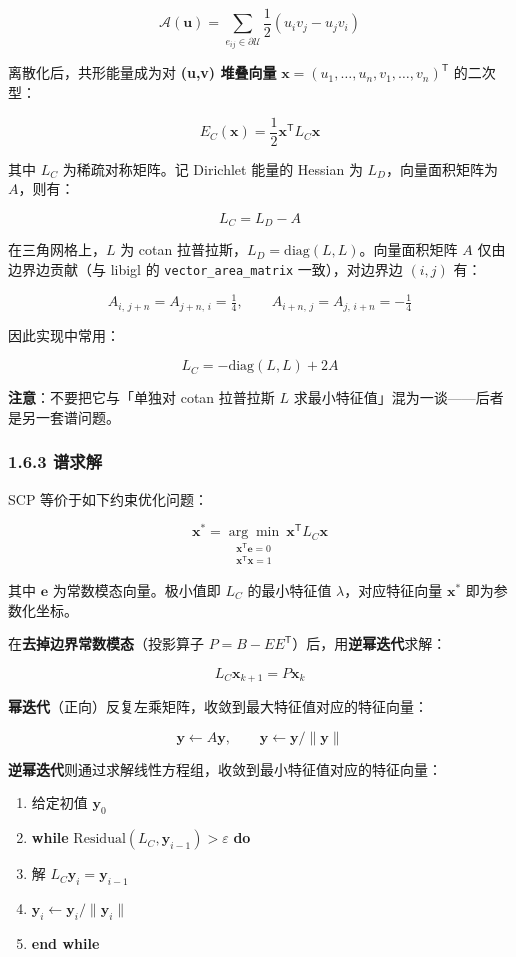 \documentclass[
]{article}
\providecommand{\tightlist}{%
  \setlength{\itemsep}{0pt}\setlength{\parskip}{0pt}}
\begin{document}
\[
\mathcal{A}(\mathbf{u}) = \sum_{e_{ij} \in \partial \mathcal{U}} \frac{1}{2}(u_i v_j - u_j v_i)
\]

离散化后，共形能量成为对 \textbf{(u,v) 堆叠向量}
\(\mathbf{x} = (u_1,\ldots,u_n,v_1,\ldots,v_n)^{\mathsf T}\) 的二次型：

\[
E_C(\mathbf{x}) = \frac{1}{2}\mathbf{x}^{\mathsf T} L_C \mathbf{x}
\]

其中 \(L_C\) 为稀疏对称矩阵。记 Dirichlet 能量的 Hessian 为
\(L_D\)，向量面积矩阵为 \(A\)，则有：

\[
L_C = L_D - A
\]

在三角网格上，\(L\) 为 cotan
拉普拉斯，\(L_D = \mathrm{diag}(L,L)\)。向量面积矩阵 \(A\)
仅由边界边贡献（与 libigl 的 \texttt{vector\_area\_matrix}
一致），对边界边 \((i,j)\) 有：

\[
A_{i,\,j+n} = A_{j+n,\,i} = \tfrac{1}{4}, \qquad
A_{i+n,\,j} = A_{j,\,i+n} = -\tfrac{1}{4}
\]

因此实现中常用：

\[
L_C = -\mathrm{diag}(L,L) + 2A
\]

\textbf{注意}：不要把它与「单独对 cotan 拉普拉斯 \(L\)
求最小特征值」混为一谈------后者是另一套谱问题。

\subsubsection{1.6.3 谱求解}\label{ux8c31ux6c42ux89e3}

SCP 等价于如下约束优化问题：

\[
\mathbf{x}^* = \underset{\substack{\mathbf{x}^{\mathsf T}\mathbf{e}=0 \\ \mathbf{x}^{\mathsf T}\mathbf{x}=1}}{\arg\min}\ \mathbf{x}^{\mathsf T} L_C \mathbf{x}
\]

其中 \(\mathbf{e}\) 为常数模态向量。极小值即 \(L_C\) 的最小特征值
\(\lambda\)，对应特征向量 \(\mathbf{x}^*\) 即为参数化坐标。

在\textbf{去掉边界常数模态}（投影算子
\(P = B - EE^{\mathsf T}\)）后，用\textbf{逆幂迭代}求解：

\[
L_C \mathbf{x}_{k+1} = P \mathbf{x}_k
\]

\textbf{幂迭代}（正向）反复左乘矩阵，收敛到最大特征值对应的特征向量：

\[
\mathbf{y} \leftarrow A\mathbf{y}, \qquad \mathbf{y} \leftarrow \mathbf{y}/\|\mathbf{y}\|
\]

\textbf{逆幂迭代}则通过求解线性方程组，收敛到最小特征值对应的特征向量：

\begin{enumerate}
\def\labelenumi{\arabic{enumi}.}
\tightlist
\item
  给定初值 \(\mathbf{y}_0\)
\item
  \textbf{while}
  \(\mathrm{Residual}(L_C, \mathbf{y}_{i-1}) > \varepsilon\) \textbf{do}
\item
  解 \(L_C \mathbf{y}_i = \mathbf{y}_{i-1}\)
\item
  \(\mathbf{y}_i \leftarrow \mathbf{y}_i / \|\mathbf{y}_i\|\)
\item
  \textbf{end while}
\end{enumerate}
\end{document}
